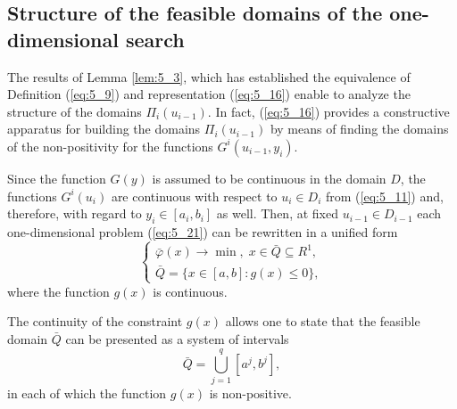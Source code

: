 \subsection {Structure of the feasible domains of the one-dimensional search}
\label{subsec:5_2_1}
The results of Lemma \ref{lem:5_3}, which has established the equivalence of Definition (\ref{eq:5_9}) and representation (\ref{eq:5_16}) enable to analyze the structure of the domains $\Pi_i(u_{i-1})$. In fact, (\ref{eq:5_16}) provides a constructive apparatus for building the domains $\Pi_i(u_{i-1})$  by means of finding the domains of the non-positivity for the functions $G^i(u_{i-1},y_i)$.

Since the function $G(y)$ is assumed to be continuous in the domain $D$, the functions $G^i(u_i)$ are continuous with respect to $u_i\in D_i$  from (\ref{eq:5_11}) and, therefore, with regard to $y_i\in [a_i,b_i]$  as well. Then, at fixed $u_{i-1}\in D_{i-1}$  each one-dimensional problem (\ref{eq:5_21}) can be rewritten in a unified form
\begin{equation}
\label{eq:5_22}
  \begin{cases}
    \bar{\varphi}(x)\rightarrow\min,\;x\in\bar{Q}\subseteq R^1, \\
    \bar{Q}=\{x\in[a,b]:g(x)\leq 0\},
  \end{cases}
\end{equation}
where the function $g(x)$ is continuous.

The continuity of the constraint $g(x)$ allows one to state that the feasible domain $\bar{Q}$  can be presented as a system of intervals
\begin{equation}
\label{eq:5_23}
\bar{Q}=\bigcup_{j=1}^q{[a^j,b^j]},
\end{equation}
in each of which the function $g(x)$ is non-positive. 

